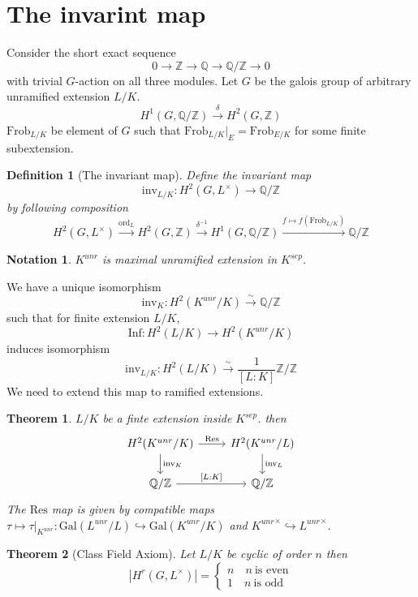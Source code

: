 \documentclass[twoside, 12pt]{iiser-thesis}
\newtheorem{thm}{{Theorem}}[section]
\newtheorem{defi}{ Definition}[section]
\newtheorem{notation}{ Notation}[section]
\newcommand{\Z}{\mathbb{Z}}
\newcommand{\Q}{\mathbb{Q}}
\newcommand{\gal}{\text{Gal}}
\begin{document}
\section{The invarint map}
Consider the short exact sequence $$ 0 \rightarrow \Z \rightarrow \Q \rightarrow \Q /\Z \rightarrow 0$$  with trivial $G$-action on all three modules. \newline
Let $G$ be the galois group of arbitrary unramified extension $L/K$. 
$$H^1(G, \Q /\Z ) \xrightarrow{\delta} H^2(G,\Z)$$
$\text{Frob}_{L/K}$ be element of $G$ such that $\text{Frob}_{L/K}\big |_{E}=\text{Frob}_{E/K}$ for some finite subextension.
\begin{defi}[The invariant map]
Define the invariant map $$\text{inv}_{L/K} : H^2(G,L^\times) \rightarrow \Q/\Z $$ by following composition 
$$ H^2 (G, L^\times ) \xrightarrow{\text{ord} _L} H^2 (G,\Z) \xrightarrow{\delta ^{-1}} H^1(G, \Q/\Z)\xrightarrow{f\mapsto f(\text{Frob}_{L/K})} \Q/\Z $$
\end{defi}
\begin{notation}
    $K^{unr}$ is maximal unramified extension in $K^{sep}$.
\end{notation}
We have a unique isomorphism 
$$ \text{inv}_K : H^2(K^{unr}/K) \xrightarrow{\sim} \Q/\Z$$ 
such that for finite extension $L/K$, 
$$\text{Inf}:H^2(L/K) \rightarrow H^2(K^{unr}/K)$$ induces isomorphism $$\text{inv}_{L/K}: H^2(L/K) \xrightarrow{\sim} \frac{1}{[L:K]}\Z/\Z$$
We need to extend this map to ramified extensions. 
\begin{thm}
$L/K$ be a finte extension inside $K^{sep}$. then 
$$\begin{tikzcd}
H^2(K^{unr}/K) \arrow[d, "\text{inv}_K"] \arrow[r, "\text{Res}"] & H^2(K^{unr}/L) \arrow[d, "\text{inv}_L"] \\
\Q/\Z \arrow[r, "{[L:K]}"]                                       & \Q /\Z               
\end{tikzcd}$$
The $\text{Res}$ map is given by compatible maps $\tau \mapsto \tau \big |_{K^{unr}}: \gal(L^{unr}/L) \hookrightarrow \gal (K^{unr}/K)$ and ${K^{unr }}^\times \hookrightarrow {L^{unr}}^\times$.
\end{thm}
\begin{thm}[Class Field Axiom]
Let $L/K$ be cyclic of order $n$ then $$|H^r(G,L^\times )| = 
\begin{cases}
n \quad n \ \text{is even} \\
1 \quad n \ \text{is odd}
\end{cases}$$
\end{thm}
\end{document}
